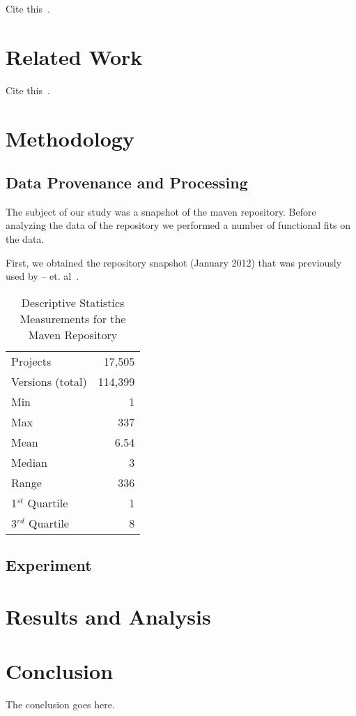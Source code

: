 \documentclass[conference]{IEEEtran}
\begin{document}
Cite this~\cite{MNN11}.

\section{Related Work}

Cite this~\cite{ZAH11}.

\section{Methodology}
\label{sec:meth}

\subsection{Data Provenance and Processing}
\label{sec:data}

The subject of our study was a snapshot of the maven repository. Before
analyzing the data of the repository we performed a number of functional fits
on the data.

First, we obtained the repository snapshot (January 2012) that was previously
used by -- et. al~\cite{}.

\begin{table}
\centering
\caption{Descriptive Statistics Measurements for the Maven Repository}
\label{tbl:repository}
\begin{tabular}{l r}
 \hline
Projects & 17,505\\
Versions (total) & 114,399\\
Min & 1\\
Max & 337\\
Mean & 6.54\\
Median & 3\\
Range & 336\\
1$^{st}$ Quartile & 1\\
3$^{rd}$ Quartile & 8\\
\hline
\end{tabular}
\end{table}

\subsection{Experiment}
\label{sec:exp}

\section{Results and Analysis}
\label{sec:res}

\section{Conclusion}
\label{sec:con}
The conclusion goes here.
\end{document}
